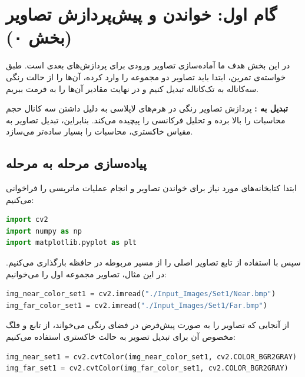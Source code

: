 \section{گام اول: خواندن و پیش‌پردازش تصاویر (بخش ۰)}

در این بخش هدف ما آماده‌سازی تصاویر ورودی برای پردازش‌های بعدی است. طبق خواسته‌ی تمرین، ابتدا باید تصاویر دو مجموعه را وارد کرده، آن‌ها را از حالت رنگی سه‌کاناله به تک‌کاناله  تبدیل کنیم و در نهایت مقادیر آن‌ها را به فرمت  ببریم.

\begin{notebox}
\textbf{تبدیل به :} پردازش تصاویر رنگی در هرم‌های لاپلاسی  به دلیل داشتن سه کانال  حجم محاسبات را بالا برده و تحلیل فرکانسی را پیچیده می‌کند. بنابراین، تبدیل تصاویر به مقیاس خاکستری، محاسبات را بسیار ساده‌تر می‌سازد.
\end{notebox}

\subsection{پیاده‌سازی مرحله به مرحله}

ابتدا کتابخانه‌های مورد نیاز برای خواندن تصاویر و انجام عملیات ماتریسی را فراخوانی می‌کنیم:

\begin{codebox}[\lr{Imports}]
\begin{lstlisting}[language=Python]
import cv2
import numpy as np
import matplotlib.pyplot as plt
\end{lstlisting}
\end{codebox}

سپس با استفاده از تابع  تصاویر اصلی را از مسیر مربوطه در حافظه بارگذاری می‌کنیم. در این مثال، تصاویر مجموعه اول را می‌خوانیم:

\begin{codebox}
\begin{lstlisting}[language=Python]
img_near_color_set1 = cv2.imread("./Input_Images/Set1/Near.bmp")
img_far_color_set1 = cv2.imread("./Input_Images/Set1/Far.bmp")
\end{lstlisting}
\end{codebox}

از آنجایی که  تصاویر را به صورت پیش‌فرض در فضای رنگی  می‌خواند، از تابع  و فلگ مخصوص آن برای تبدیل تصویر به حالت خاکستری استفاده می‌کنیم:

\begin{codebox}
\begin{lstlisting}[language=Python]
img_near_set1 = cv2.cvtColor(img_near_color_set1, cv2.COLOR_BGR2GRAY)
img_far_set1 = cv2.cvtColor(img_far_color_set1, cv2.COLOR_BGR2GRAY)
\end{lstlisting}
\end{codebox}

